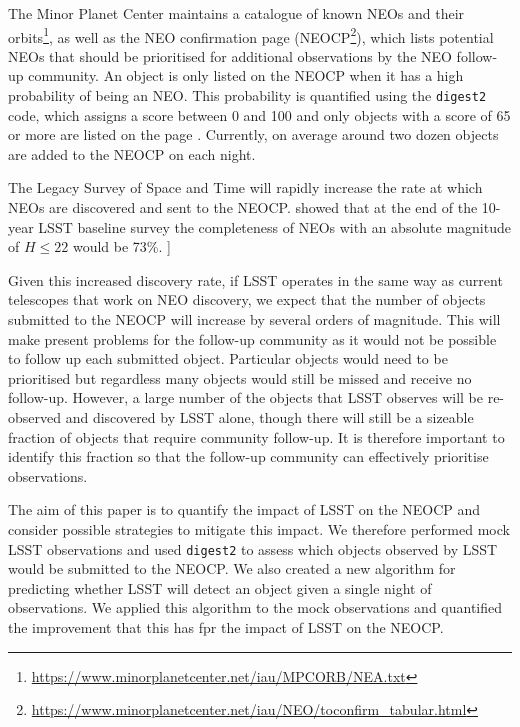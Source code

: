 \documentclass[twocolumn]{aastex631}
\newcommand{\todo}[1]{{\color{red}{[TODO: #1}]}}
\newcommand{\dig}{\texttt{digest2}}
\begin{document}
The Minor Planet Center maintains a catalogue of known NEOs and their orbits\footnote{\url{https://www.minorplanetcenter.net/iau/MPCORB/NEA.txt}}, as well as the NEO confirmation page (NEOCP\footnote{\url{https://www.minorplanetcenter.net/iau/NEO/toconfirm_tabular.html}}), which lists potential NEOs that should be prioritised for additional observations by the NEO follow-up community. An object is only listed on the NEOCP when it has a high probability of being an NEO. This probability is quantified using the \dig{} code, which assigns a score between 0 and 100 and only objects with a score of 65 or more are listed on the page \citep{Keys+2019}. Currently, on average around two dozen objects are added to the NEOCP on each night.

The Legacy Survey of Space and Time \citep[LSST,][]{Ivezic+2019} will rapidly increase the rate at which NEOs are discovered and sent to the NEOCP. \citet{Jones+2018} showed that at the end of the 10-year LSST baseline survey the completeness of NEOs with an absolute magnitude of $H \le 22$ would be 73\%. \todo{probably need more details here, e.g.\ how many NEOs discovered in only a year, like in Mario's scary AAS presentations}

Given this increased discovery rate, if LSST operates in the same way as current telescopes that work on NEO discovery, we expect that the number of objects submitted to the NEOCP will increase by several orders of magnitude. This will make present problems for the follow-up community as it would not be possible to follow up each submitted object. Particular objects would need to be prioritised but regardless many objects would still be missed and receive no follow-up. However, a large number of the objects that LSST observes will be re-observed and discovered by LSST alone, though there will still be a sizeable fraction of objects that require community follow-up. It is therefore important to identify this fraction so that the follow-up community can effectively prioritise observations.

The aim of this paper is to quantify the impact of LSST on the NEOCP and consider possible strategies to mitigate this impact. We therefore performed mock LSST observations and used \dig{} to assess which objects observed by LSST would be submitted to the NEOCP. We also created a new algorithm for predicting whether LSST will detect an object given a single night of observations. We applied this algorithm to the mock observations and quantified the improvement that this has fpr the impact of LSST on the NEOCP.
\end{document}
